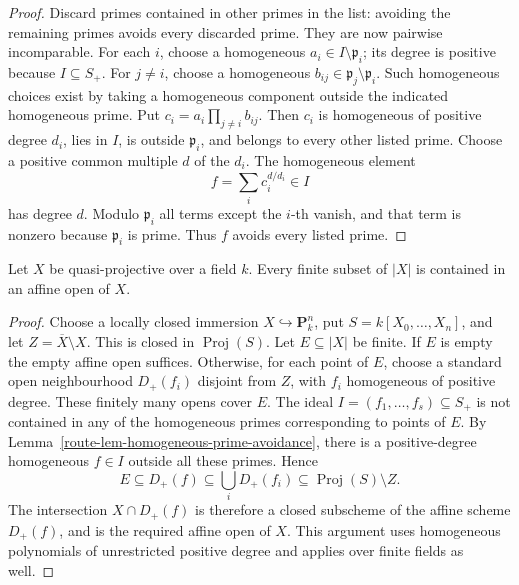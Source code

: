 \begin{proof}
  Discard primes contained in other primes in the list: avoiding the
  remaining primes avoids every discarded prime. They are now pairwise
  incomparable. For each \(i\), choose a homogeneous
  \(a_i\in I\setminus\mathfrak p_i\); its degree is positive because
  \(I\subseteq S_+\). For \(j\ne i\), choose a homogeneous
  \(b_{ij}\in\mathfrak p_j\setminus\mathfrak p_i\). Such homogeneous
  choices exist by taking a homogeneous component outside the indicated
  homogeneous prime. Put \(c_i=a_i\prod_{j\ne i}b_{ij}\). Then \(c_i\)
  is homogeneous of positive degree \(d_i\), lies in \(I\), is outside
  \(\mathfrak p_i\), and belongs to every other listed prime. Choose a
  positive common multiple \(d\) of the \(d_i\). The homogeneous element
  \[
    f=\sum_i c_i^{d/d_i}\in I
  \]
  has degree \(d\). Modulo \(\mathfrak p_i\) all terms except the
  \(i\)-th vanish, and that term is nonzero because \(\mathfrak p_i\)
  is prime. Thus \(f\) avoids every listed prime.
\end{proof}

\begin{lemma}
  \label{route-lem-quasiprojective-finite-affine}
  \notready

  Let \(X\) be quasi-projective over a field \(k\). Every finite subset
  of \(|X|\) is contained in an affine open of \(X\).
\end{lemma}

\begin{proof}
  Choose a locally closed immersion \(X\hookrightarrow\mathbf P^n_k\),
  put \(S=k[X_0,\ldots,X_n]\), and let
  \(Z=\overline X\setminus X\). This is closed in
  \(\operatorname{Proj}(S)\). Let \(E\subseteq|X|\) be finite. If
  \(E\) is empty the empty affine open suffices. Otherwise, for each
  point of \(E\), choose a standard open neighbourhood \(D_+(f_i)\)
  disjoint from \(Z\), with \(f_i\) homogeneous of positive degree.
  These finitely many opens cover \(E\). The ideal
  \(I=(f_1,\ldots,f_s)\subseteq S_+\) is not contained in any of the
  homogeneous primes corresponding to points of \(E\). By
  Lemma~\ref{route-lem-homogeneous-prime-avoidance}, there is a
  positive-degree homogeneous \(f\in I\) outside all these primes.
  Hence
  \[
    E\subseteq D_+(f)\subseteq\bigcup_i D_+(f_i)
      \subseteq\operatorname{Proj}(S)\setminus Z.
  \]
  The intersection \(X\cap D_+(f)\) is therefore a closed subscheme of
  the affine scheme \(D_+(f)\), and is the required affine open of \(X\).
  This argument uses homogeneous polynomials of unrestricted positive
  degree and applies over finite fields as well.
\end{proof}

